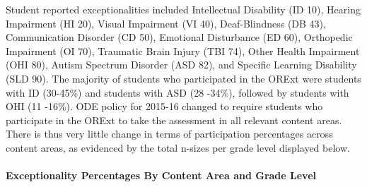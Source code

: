 \documentclass[]{article}
\let\oldparagraph\paragraph
\renewcommand{\paragraph}[1]{\oldparagraph{#1}\mbox{}}
\begin{document}
Student reported exceptionalities included Intellectual Disability (ID
10), Hearing Impairment (HI 20), Visual Impairment (VI 40),
Deaf-Blindness (DB 43), Communication Disorder (CD 50), Emotional
Disturbance (ED 60), Orthopedic Impairment (OI 70), Traumatic Brain
Injury (TBI 74), Other Health Impairment (OHI 80), Autism Spectrum
Disorder (ASD 82), and Specific Learning Disability (SLD 90). The
majority of students who participated in the ORExt were students with ID
(30-45\%) and students with ASD (28 -34\%), followed by students with
OHI (11 -16\%). ODE policy for 2015-16 changed to require students who
participate in the ORExt to take the assessment in all relevant content
areas. There is thus very little change in terms of participation
percentages across content areas, as evidenced by the total n-sizes per
grade level displayed below.

\clearpage

\paragraph{Exceptionality Percentages By Content Area and Grade
Level}\label{exceptionality-percentages-by-content-area-and-grade-level}
\end{document}
